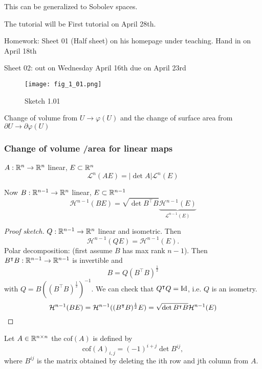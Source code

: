 This can be generalized to Sobolev spaces.




The tutorial will be  First tutorial on  April 28th.

Homework: Sheet 01 (Half sheet) on his homepage under teaching. Hand in on April 18th

Sheet 02: out on Wednesday April 16th due on April 23rd

\begin{figure}[H]\label{fig:1.01}
    \centering
    \texttt{[image: fig\_1\_01.png]}
    \caption{Sketch 1.01}
\end{figure}

Change of volume from \(U\to \varphi(U)\) and the change of surface area from \(\partial U \to \partial \varphi(U)\)

\subsubsection*{Change of volume /area for linear maps}

\(A:\mathbb{R}^n\to\mathbb{R}^n\) linear, \(E\subset\mathbb{R}^n\)
\[\mathcal{L}^n(AE)=|\det A|\mathcal{L}^n(E)\]

Now \(B:\mathbb{R}^{n-1}\to\mathbb{R}^n\) linear, \(E\subset\mathbb{R}^{n-1}\)
\[\mathcal{H}^{n-1}(BE)=\sqrt{\det B^\intercal B} \underbrace{\mathcal{H}^{n-1}(E)}_{\mathcal{L}^{n-1}(E)}\]

\begin{proof}[Proof sketch]
    \(Q:\mathbb{R}^{n-1}\to\mathbb{R}^n\) linear and isometric. Then 
    \[\mathcal{H}^{n-1}(QE)=\mathcal{H}^{n-1}(E).\]
    Polar decomposition: (first assume \(B\) has max rank \(n-1\)). Then \(B^\intercal B:\mathbb{R}^{n-1}\to\mathbb{R}^{n-1}\) is invertible and 
    \[B=Q(B^\intercal B)^{\frac{1}{2}}\]
    with \(Q=B\left((B^\intercal B)^{\frac{1}{2}}\right)^{-1}\). We can check that \(Q^\intercal Q=\text{Id}\), i.e. 
    \(Q\) is an isometry.
    \[\mathcal{H}^{n-1}(BE)=\mathcal{H}^{n-1}((B^\intercal B)^{\frac{1}{2}}E)=\sqrt{\det B^\intercal B} \mathcal{H}^{n-1}(E)\qedhere\]
\end{proof}

\begin{definition}\label{def:1.8}
    Let \(A\in \mathbb{R}^{n\times n}\) the  \(\text{cof}(A)\) is defined by 
    \[\text{cof}(A)_{i,j}=(-1)^{i+j}\det B^{ij},\]
    where \(B^{ij}\) is the matrix obtained by deleting the ith row and jth column from \(A\).
\end{definition}

